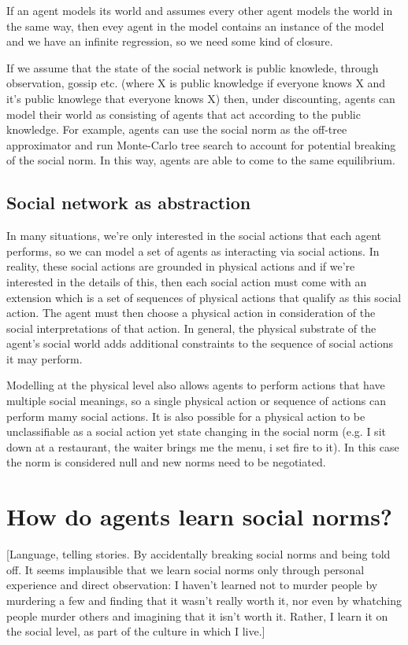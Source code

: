 \documentclass[a4paper]{article}
\begin{document}
If an agent models its world and assumes every other agent models the world in the same way, then evey agent in the model contains an instance of the model and we have an infinite regression, so we need some kind of closure.

If we assume that the state of the social network is public knowlede, through observation, gossip etc. (where X is public knowledge if everyone knows X and it's public knowlege that everyone knows X) then, under discounting, agents can model their world as consisting of agents that act according to the public knowledge. For example, agents can use the social norm as the off-tree approximator and run Monte-Carlo tree search to account for potential breaking of the social norm. In this way, agents are able to come to the same equilibrium.



\subsection{Social network as abstraction}

In many situations, we're only interested in the social actions that each agent performs, so we can model a set of agents as interacting via social actions. In reality, these social actions are grounded in physical actions and if we're interested in the details of this, then each social action must come with an extension which is a set of sequences of physical actions that qualify as this social action. The agent must then choose a physical action in consideration of the social interpretations of that action. In general, the physical substrate of the agent's social world adds additional constraints to the sequence of social actions it may perform.

Modelling at the physical level also allows agents to perform actions that have multiple social meanings, so a single physical action or sequence of actions can perform mamy social actions. It is also possible for a physical action to be unclassifiable as a social action yet state changing in the social norm (e.g. I sit down at a restaurant, the waiter brings me the menu, i set fire to it). In this case the norm is considered null and new norms need to be negotiated.

\section{How do agents learn social norms?}


[Language, telling stories. By accidentally breaking social norms and being told off. It seems implausible that we learn social norms only through personal experience and direct observation: I haven't learned not to murder people by murdering a few and finding that it wasn't really worth it, nor even by whatching people murder others and imagining that it isn't worth it. Rather, I learn it on the social level, as part of the culture in which I live.]
\end{document}
